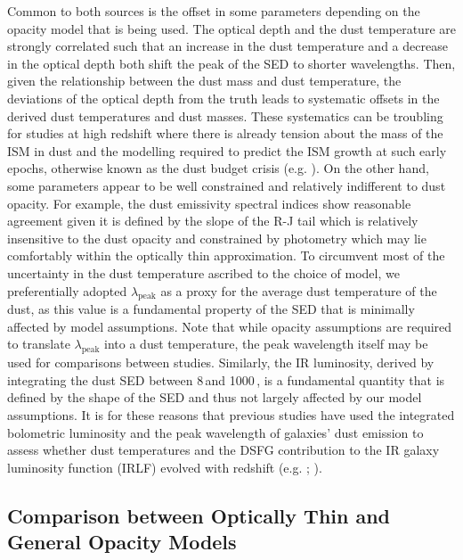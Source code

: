 Common to both sources is the offset in some parameters depending on the opacity model that is being used. The optical depth and the dust temperature are strongly correlated such that an increase in the dust temperature and a decrease in the optical depth both shift the peak of the SED to shorter wavelengths. Then, given the relationship between the dust mass and dust temperature,  the deviations of the optical depth from the truth leads to systematic offsets in the derived dust temperatures and dust masses. These systematics can be troubling for studies at high redshift where there is already tension about the mass of the ISM in dust and the modelling required to predict the ISM growth at such early epochs, otherwise known as the dust budget crisis (e.g. \citealt{Rowlands_2014}). On the other hand, some parameters appear to be well constrained and relatively indifferent to dust opacity. For example, the dust emissivity spectral indices show reasonable agreement given it is defined by the slope of the R-J tail which is relatively insensitive to the dust opacity and constrained by photometry which may lie comfortably within the optically thin approximation. To circumvent most of the uncertainty in the dust temperature ascribed to the choice of model, we preferentially adopted $\lambda_\textrm{peak}$ as a proxy for the average dust temperature of the dust, as this value is a fundamental property of the SED that is minimally affected by model assumptions. Note that while opacity assumptions are required to translate $\lambda_\textrm{peak}$ into a dust temperature, the peak wavelength itself may be used for comparisons between studies. Similarly, the IR luminosity, derived by integrating the dust SED between 8\,\micron and 1000\,\micron, is a fundamental quantity that is defined by the shape of the SED and thus not largely affected by our model assumptions. It is for these reasons that previous studies have used the integrated bolometric luminosity and the peak wavelength of galaxies' dust emission to assess whether dust temperatures and the DSFG contribution to the IR galaxy luminosity function (IRLF) evolved with redshift (e.g. \citealt{Casey_2018}; \citealt{Drew_2022}).

\subsection{Comparison between Optically Thin and General Opacity Models}
\label{sec:comparison_optically_thin_and_general_opacity}

